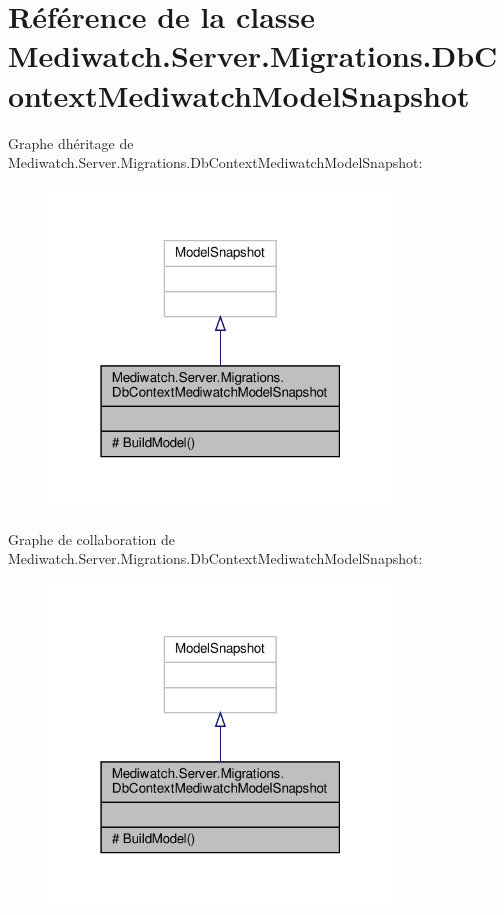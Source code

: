 \hypertarget{class_mediwatch_1_1_server_1_1_migrations_1_1_db_context_mediwatch_model_snapshot}{}\section{Référence de la classe Mediwatch.\+Server.\+Migrations.\+Db\+Context\+Mediwatch\+Model\+Snapshot}
\label{class_mediwatch_1_1_server_1_1_migrations_1_1_db_context_mediwatch_model_snapshot}


Graphe d\textquotesingle{}héritage de Mediwatch.\+Server.\+Migrations.\+Db\+Context\+Mediwatch\+Model\+Snapshot\+:
\nopagebreak
\begin{figure}[H]
\begin{center}
\leavevmode
\includegraphics[width=259pt]{class_mediwatch_1_1_server_1_1_migrations_1_1_db_context_mediwatch_model_snapshot__inherit__graph}
\end{center}
\end{figure}


Graphe de collaboration de Mediwatch.\+Server.\+Migrations.\+Db\+Context\+Mediwatch\+Model\+Snapshot\+:
\nopagebreak
\begin{figure}[H]
\begin{center}
\leavevmode
\includegraphics[width=259pt]{class_mediwatch_1_1_server_1_1_migrations_1_1_db_context_mediwatch_model_snapshot__coll__graph}
\end{center}
\end{figure}
